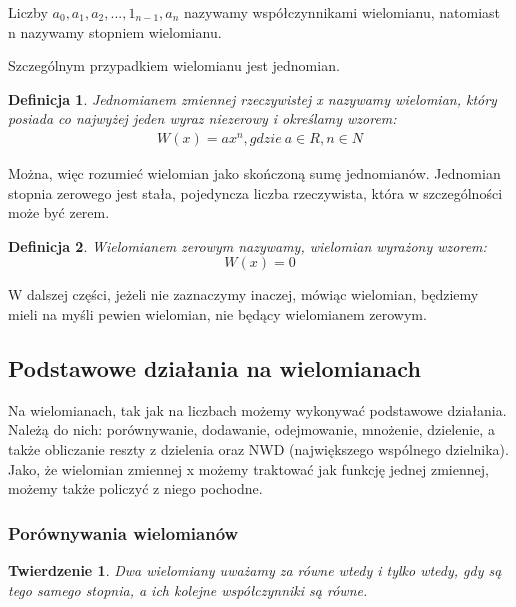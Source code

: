 \documentclass[twoside,a4paper]{book}
\newtheorem{theorem}{Twierdzenie}
\newtheorem{definition}{Definicja}
\begin{document}
Liczby $a_0, a_1, a_2, ..., 1_{n-1}, a_n$ nazywamy współczynnikami wielomianu, natomiast n nazywamy stopniem wielomianu.
	
Szczególnym przypadkiem wielomianu jest jednomian. 

\begin{definition}
	Jednomianem zmiennej rzeczywistej x nazywamy wielomian, który posiada co najwyżej jeden wyraz niezerowy i określamy wzorem:
	\begin{equation}
		\begin{split}
			W(x) = ax^n, gdzie\ a\in R, n \in N 
		\end{split}
	\end{equation}
\end{definition}

Można, więc rozumieć wielomian jako skończoną sumę jednomianów.
Jednomian stopnia zerowego jest stała, pojedyncza liczba rzeczywista, która w szczególności może być zerem.

\begin{definition}
	Wielomianem zerowym nazywamy, wielomian wyrażony wzorem:
	\begin{equation}
		W(x) = 0
	\end{equation}
\end{definition}

W dalszej części, jeżeli nie zaznaczymy inaczej, mówiąc wielomian, będziemy mieli na myśli pewien wielomian, nie będący wielomianem zerowym.

\subsection{Podstawowe działania na wielomianach}

Na wielomianach, tak jak na liczbach możemy wykonywać podstawowe działania. Należą do nich: porównywanie, dodawanie, odejmowanie, mnożenie, dzielenie, a także obliczanie reszty z dzielenia oraz NWD (największego wspólnego dzielnika). Jako, że wielomian zmiennej x możemy traktować jak funkcję jednej zmiennej, możemy także policzyć z niego pochodne.

\subsubsection{Porównywania wielomianów}

\begin{theorem}
	Dwa wielomiany uważamy za równe wtedy i tylko wtedy, gdy są tego samego stopnia, a ich kolejne współczynniki są równe.
\end{theorem}
\end{document}
